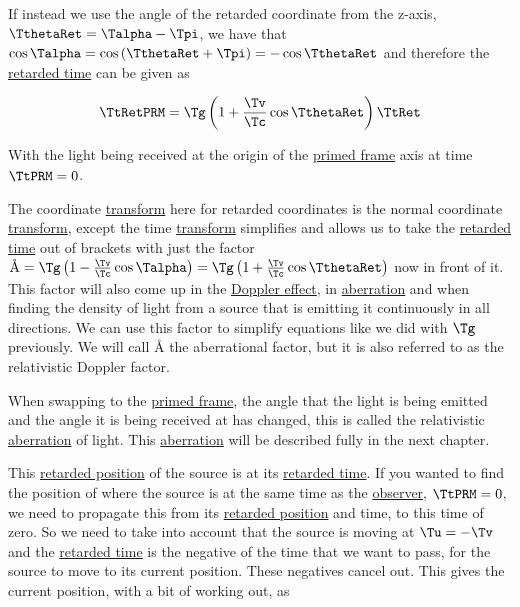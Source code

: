If instead we use the angle of the retarded coordinate from the z-axis, $\TthetaRet  = \Talpha  - \Tpi $, we have that $\cos{\Talpha }=\cos{(\TthetaRet +\Tpi )}=-\cos{\TthetaRet  }$ and therefore the \hyperlink{def-retarded-time}{retarded time} can be given as

\begin{equation}
	\\ { \TtRetPRM  } = \Tg  \left(1 + \frac{\Tv }{\Tc } \cos{\TthetaRet  } \right) { { \TtRet  } }
\end{equation}

With the light being received at the origin of the \hyperlink{def-Primed-Frame}{primed frame} axis at time $\TtPRM  = 0$.

The coordinate \hyperlink{def-transform}{transform} here for retarded coordinates is the normal coordinate \hyperlink{def-transform}{transform}, except the time \hyperlink{def-transform}{transform} simplifies and allows us to take the \hyperlink{def-retarded-time}{retarded time} out of brackets with just the factor $\text{\AA}={\Tg } \left(1-\frac{\Tv }{\Tc } \cos{\Talpha } \right) = \Tg  \left(1 + \frac{\Tv }{\Tc } \cos{\TthetaRet  } \right)$ now in front of it.
This factor will also come up in the \hyperlink{def-doppler-effect}{Doppler effect}, in \hyperlink{def-aberration}{aberration} and when finding the density of light from a source that is emitting it continuously in all directions.
We can use this factor to simplify equations like we did with $\Tg $ previously.
We will call $\text{\AA}$ the aberrational factor, but it is also referred to as the relativistic Doppler factor.

When swapping to the \hyperlink{def-Primed-Frame}{primed frame}, the angle that the light is being emitted and the angle it is being received at has changed, this is called the relativistic \hyperlink{def-aberration}{aberration} of light.
This \hyperlink{def-aberration}{aberration} will be described fully in the next chapter.

\sidenote

This \hyperlink{def-retarded-position}{retarded position} of the source is at its \hyperlink{def-retarded-time}{retarded time}.
If you wanted to find the position of where the source is at the same time as the \hyperlink{def-observer}{observer}, $\TtPRM =0$, we need to propagate this from its \hyperlink{def-retarded-position}{retarded position} and time, to this time of zero.
So we need to take into account that the source is moving at $\Tu  = -\Tv $ and the \hyperlink{def-retarded-time}{retarded time} is the negative of the time that we want to pass, for the source to move to its current position.
These negatives cancel out.
This gives the current position, with a bit of working out, as

